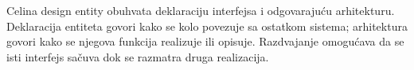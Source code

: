 Celina design entity obuhvata deklaraciju interfejsa i odgovarajuću arhitekturu. Deklaracija entiteta govori kako se kolo povezuje sa ostatkom sistema; arhitektura govori kako se njegova funkcija realizuje ili opisuje. Razdvajanje omogućava da se isti interfejs sačuva dok se razmatra druga realizacija.
